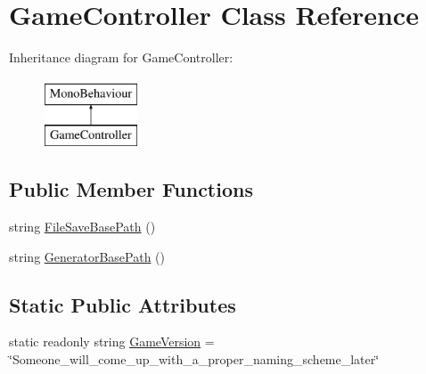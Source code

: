 \hypertarget{class_game_controller}{}\section{Game\+Controller Class Reference}
\label{class_game_controller}
Inheritance diagram for Game\+Controller\+:\begin{figure}[H]
\begin{center}
\leavevmode
\includegraphics[height=2.000000cm]{class_game_controller}
\end{center}
\end{figure}
\subsection*{Public Member Functions}
\begin{DoxyCompactItemize}
\item 
string \hyperlink{class_game_controller_a6563e51093141ab23c0b7f8e8c2a5922}{File\+Save\+Base\+Path} ()
\item 
string \hyperlink{class_game_controller_a69e1467ff4c36d433484356f15949c56}{Generator\+Base\+Path} ()
\end{DoxyCompactItemize}
\subsection*{Static Public Attributes}
\begin{DoxyCompactItemize}
\item 
static readonly string \hyperlink{class_game_controller_a16770a91abcdf92f012418daf53c138d}{Game\+Version} = \char`\"{}Someone\+\_\+will\+\_\+come\+\_\+up\+\_\+with\+\_\+a\+\_\+proper\+\_\+naming\+\_\+scheme\+\_\+later\char`\"{}
\end{DoxyCompactItemize}
